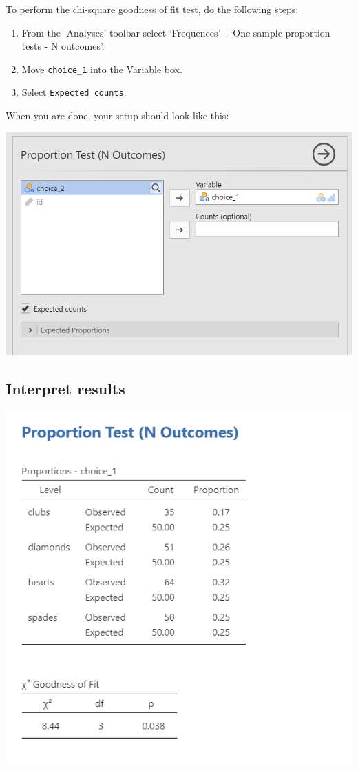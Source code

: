 \documentclass[
]{book}
\begin{document}
To perform the chi-square goodness of fit test, do the following steps:

\begin{enumerate}
\def\labelenumi{\arabic{enumi}.}
\item
  From the `Analyses' toolbar select `Frequences' - `One sample proportion tests - N outcomes'.
\item
  Move \texttt{choice\_1} into the Variable box.
\item
  Select \texttt{Expected\ counts}.
\end{enumerate}

When you are done, your setup should look like this:

\includegraphics{images/09-chi-square/chi-square_setup.png}

\hypertarget{interpret-results-2}{%
\subsection{Interpret results}\label{interpret-results-2}}

\includegraphics{images/09-chi-square/chi-square_results.png}
\end{document}

